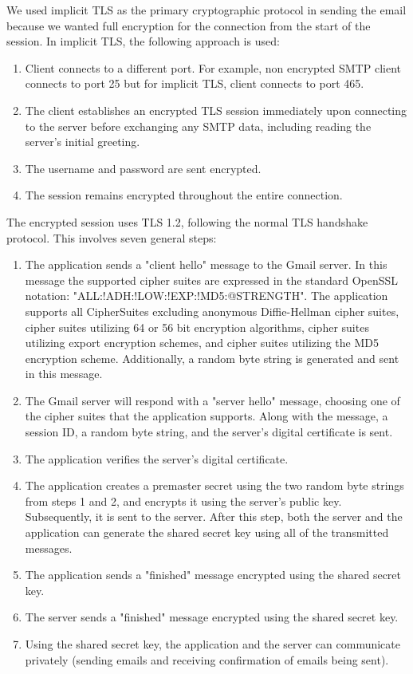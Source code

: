 \documentclass[a4paper,twoside,10pt]{report}
\begin{document}
We used implicit TLS as the primary cryptographic protocol in sending the email because we wanted full encryption for the connection from the start of the session. In implicit TLS, the following approach is used:
\begin{enumerate}
	\item Client connects to a different port. For example, non encrypted SMTP client connects to port 25 but for implicit TLS, client connects to port 465.
	\item The client establishes an encrypted TLS session immediately upon connecting to the server before exchanging any SMTP data, including reading the server's initial greeting. 
	\item The username and password are sent encrypted.
	\item The session remains encrypted throughout the entire connection.
\end{enumerate}

The encrypted session uses TLS 1.2, following the normal TLS handshake protocol. This involves seven general steps:
\begin{enumerate}
	\item The application sends a "client hello" message to the Gmail server. In this message the supported cipher suites are expressed in the standard OpenSSL notation: "ALL:!ADH:!LOW:!EXP:!MD5:@STRENGTH". The application supports all CipherSuites excluding anonymous Diffie-Hellman cipher suites, cipher suites utilizing 64 or 56 bit encryption algorithms, cipher suites utilizing export encryption schemes, and cipher suites utilizing the MD5 encryption scheme. Additionally, a random byte string is generated and sent in this message.
	\item The Gmail server will respond with a "server hello" message, choosing one of the cipher suites that the application supports. Along with the message, a session ID, a random byte string, and the server's digital certificate is sent. 
	\item The application verifies the server's digital certificate.
	\item The application creates a premaster secret using the two random byte strings from steps 1 and 2, and encrypts it using the server's public key. Subsequently, it is sent to the server. After this step, both the server and the application can generate the shared secret key using all of the transmitted messages.
	\item The application sends a "finished" message encrypted using the shared secret key.
	\item The server sends a "finished" message encrypted using the shared secret key.
	\item Using the shared secret key, the application and the server can communicate privately (sending emails and receiving confirmation of emails being sent).
\end{enumerate}
\end{document}
